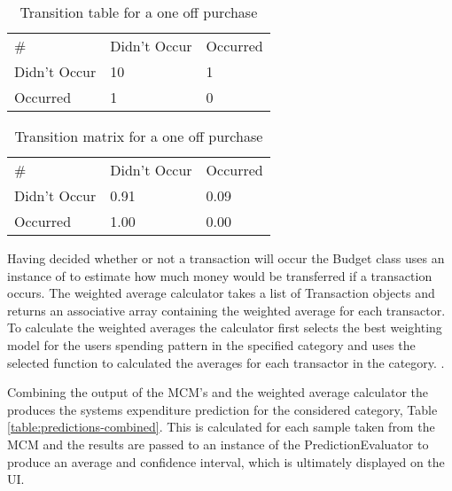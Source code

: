 \begin{table}[!htb]
  \centering
    \begin{tabular}{lll}
    \#           & Didn't Occur & Occurred \\
    Didn't Occur & 10           & 1       \\
    Occurred     & 1            & 0      
    \end{tabular}
    \caption{Transition table for a one off purchase}
    \label{table:transition-table} 
\end{table}

\begin{table}[!htb]
  \centering
    \begin{tabular}{lll}
    \#           & Didn't Occur & Occurred \\
    Didn't Occur & 0.91         & 0.09       \\
    Occurred     & 1.00         & 0.00     
    \end{tabular}
    \caption{Transition matrix for a one off purchase}
    \label{table:transition-matrix}
   
\end{table}

Having decided whether or not a transaction will occur the Budget class uses an instance of  to estimate how much money would be transferred if a transaction occurs. The weighted average calculator takes a list of Transaction objects and returns an associative array containing the weighted average for each transactor. To calculate the weighted averages the calculator first selects the best weighting model for the users spending pattern in the specified category and uses the selected function to calculated the averages for each transactor in the category. .

Combining the output of the MCM's and the weighted average calculator the produces the systems expenditure prediction for the considered category, Table \ref{table:predictions-combined}. This is calculated for each sample taken from the MCM and the results are passed to an instance of the PredictionEvaluator to produce an average and confidence interval, which is ultimately displayed on the UI.


